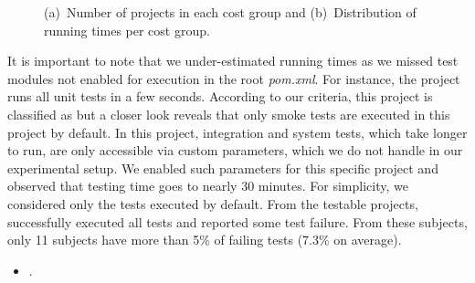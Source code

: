 \begin{figure}[ht]
\begin{subfigure}{0.25\textwidth}
    \caption{\label{fig:rq1-boxplot}}
  \end{subfigure}%
  \caption{(a)~Number of projects in each cost group and
    (b)~Distribution of running times per cost group.}
  \vspace{-1ex}
\end{figure}

It is important to note that we under-estimated running times as we missed test modules not enabled for
execution in the root \emph{pom.xml}. For instance, the project 
runs all unit tests in a few seconds.  According to our criteria, this
project is classified as \shortg{} but a closer look reveals
that only smoke tests are executed in this project by default.
In this project, integration and system tests, which take longer to run, are only accessible via
custom parameters, which we do not handle in our experimental setup.
We enabled such parameters for this specific project and observed that
testing time goes to nearly 30 minutes.  For simplicity, we considered
only the tests executed by default.
From the \numSubjs{} testable projects, \numSubjsPass{} successfully
executed all tests and \numSubjsFail{} reported some test failure.
From these \numSubjsFail{} subjects, only 11 subjects
have more than 5\% of failing tests (7.3\% on average).
\begin{center}
\vspace{1ex}
\vspace{1ex}
\end{center}

\begin{itemize}
  \item \numRQFeasibilityTwo. \textbf{\RQFeasibilityTwo}
\end{itemize}

